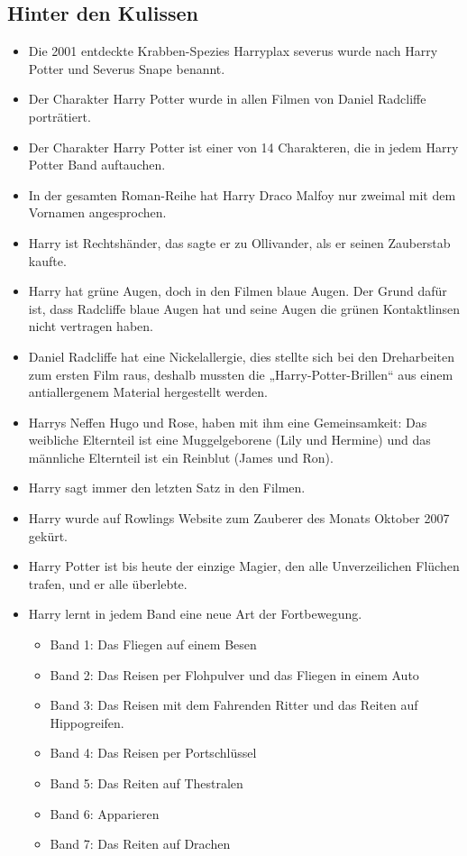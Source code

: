 \documentclass[a4paper, 10pt]{article}
\begin{document}
\subsection*{\Large Hinter den Kulissen}
\vspace{10pt}
\begin{itemize}
    \item Die 2001 entdeckte Krabben-Spezies Harryplax severus wurde nach Harry Potter und Severus Snape benannt.
    \item Der Charakter Harry Potter wurde in allen Filmen von Daniel Radcliffe porträtiert.
    \item Der Charakter Harry Potter ist einer von 14 Charakteren, die in jedem Harry Potter Band auftauchen.
    \item In der gesamten Roman-Reihe hat Harry Draco Malfoy nur zweimal mit dem Vornamen angesprochen.
    \item Harry ist Rechtshänder, das sagte er zu Ollivander, als er seinen Zauberstab kaufte.
    \item Harry hat grüne Augen, doch in den Filmen blaue Augen. Der Grund dafür ist, dass Radcliffe blaue Augen hat und seine Augen die grünen Kontaktlinsen nicht vertragen haben.
    \item Daniel Radcliffe hat eine Nickelallergie, dies stellte sich bei den Dreharbeiten zum ersten Film raus, deshalb mussten die „Harry-Potter-Brillen“ aus einem antiallergenem Material hergestellt werden.
    \item Harrys Neffen Hugo und Rose, haben mit ihm eine Gemeinsamkeit: Das weibliche Elternteil ist eine Muggelgeborene (Lily und Hermine) und das männliche Elternteil ist ein Reinblut (James und Ron).
    \item Harry sagt immer den letzten Satz in den Filmen.
    \item Harry wurde auf Rowlings Website zum Zauberer des Monats Oktober 2007 gekürt.
    \item Harry Potter ist bis heute der einzige Magier, den alle Unverzeilichen Flüchen trafen, und er alle überlebte.
    \item Harry lernt in jedem Band eine neue Art der Fortbewegung.
    \begin{itemize}
        \item Band 1: Das Fliegen auf einem Besen
        \item Band 2: Das Reisen per Flohpulver und das Fliegen in einem Auto
        \item Band 3: Das Reisen mit dem Fahrenden Ritter und das Reiten auf Hippogreifen.
        \item Band 4: Das Reisen per Portschlüssel
        \item Band 5: Das Reiten auf Thestralen
        \item Band 6: Apparieren
        \item Band 7: Das Reiten auf Drachen
    \end{itemize}
\end{itemize}
\end{document}
